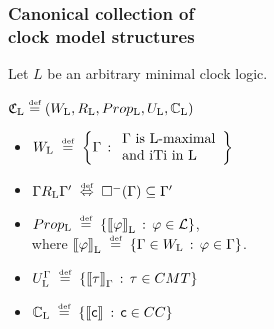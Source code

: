 \documentclass[xcolor=x11names]{beamer}
\newcommand{\bluebullet}{\textcolor{DeepSkyBlue3}{\quad $\bullet$} \,\,}
\newcommand{\defegy}[1][.1]{\hspace{#1cm}\overset{\textup{\tiny def}}{=}\hspace{#1cm}}
\newcommand{\defekv}[1][.1]{\hspace{#1cm}\overset{\textup{\tiny def}}{ \Leftrightarrow }\hspace{#1cm}}
\newcommand{\wintension}[3][]{{[}\hspace{-.46mm}{[} {#3}{]}\hspace{-.46mm}{]}^{\mathfrak{#1}}_{#2}}
\newcommand{\canintension}[2][]{{[}\hspace{-.46mm}{[} {#2}{]}\hspace{-.46mm}{]}_{\mathrm{#1}}}
\begin{document}
\begin{frame}[t]
	\frametitle{Canonical collection of \\ clock model structures}
\footnotesize

Let $L$ be an arbitrary minimal clock logic.

$\mathfrak C_{\mathrm{L}}\defegy[0] \left( W_{\mathrm{L}}, R_{\mathrm{L}}, Prop_{\mathrm{L}}, U_{\mathrm{L}}, \mathbb C_{\mathrm{L}} %
    \right)$
\begin{itemize}
\item $W_{\mathrm{L}} \defegy \left\{ \Gamma \, :  \begin{array}{l}\Gamma \textup{ is $\mathrm{L}$-maximal} \\ \textup{and iTi in L}\end{array}\right\}$
\item $\Gamma R_{\mathrm L} \Gamma' \defekv \Box ^- (\Gamma) \subseteq \Gamma '$
\item $Prop_{\mathrm{L}} \defegy \left\{ \canintension[L]\varphi \, :\, \varphi\in\mathcal L\right\}$,
\\ \quad where $\canintension[L]\varphi \defegy \{\Gamma\in W_{\mathrm{L}}\,:\, \varphi \in \Gamma\}$.
\item $U_{\mathrm L}^\Gamma \defegy \{\wintension{\Gamma}{\tau} \, : \,\tau \in CMT\}$
\item $\mathbb C_{\mathrm{L}} \defegy \{\wintension{}{\mathsf c} \, : \, \mathsf{c}\in CC\}$
\end{itemize}


\end{frame}
\end{document}
